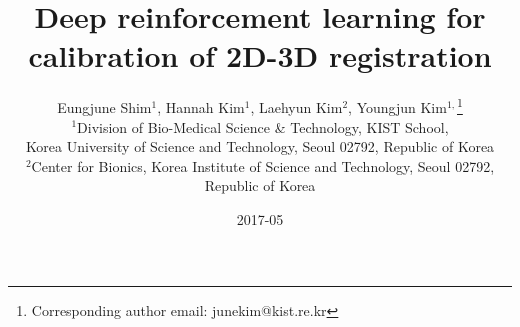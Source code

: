 \documentclass[10pt]{article}
\begin{document}
\title{Deep reinforcement learning for calibration of 2D-3D registration}

\author{Eungjune Shim$^1$, Hannah Kim$^1$, Laehyun Kim$^2$, Youngjun Kim$^{1,}$\thanks{Corresponding author email: junekim@kist.re.kr}\\
$^1$Division of Bio-Medical Science \& Technology, KIST School, \\
Korea University of Science and Technology, Seoul 02792, Republic of Korea
\\ $^2$Center for Bionics, Korea Institute of Science and Technology, Seoul 02792, Republic of Korea}

\date{2017-05}
\maketitle
\end{document}
